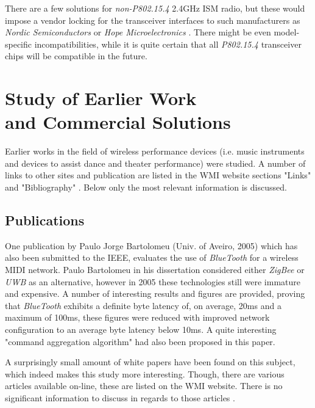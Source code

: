   There are a few solutions for \emph{non-P802.15.4} 2.4GHz ISM radio,
 but these would impose a vendor locking for the transceiver interfaces
 to such manufacturers as \emph{Nordic Semiconductors} \cite{links:nordic:rf2400}
 or \emph{Hope Microelectronics} \cite{links:hoperf:rf2400}.
 There might be even model-specific incompatibilities, while 
 it is quite certain that all \emph{P802.15.4} transceiver
 chips will be compatible in the future.

\break

\section{Study of Earlier Work \\and Commercial Solutions}

  Earlier works in the field of wireless performance devices (i.e. music instruments and
  devices to assist dance and theater performance) were studied. A number of links to
  other sites and publication are listed in the WMI website sections "Links" \cite{wmi:wiki:links}
  and "Bibliography" \cite{wmi:wiki:refs}. Below only the most relevant information is discussed.

\subsection{Publications}

  One publication by Paulo Jorge Bartolomeu (Univ. of Aveiro, 2005)
 \cite{pub:bartolomeu2005} which has also been submitted to the IEEE,
 evaluates the use of \emph{BlueTooth} for a wireless MIDI network.
 Paulo Bartolomeu in his dissertation considered either \emph{ZigBee} or
 \emph{UWB} as an alternative, however in 2005 these technologies
 still were immature and expensive. A number of interesting results and
 figures are provided, proving that \emph{BlueTooth} exhibits a definite
 byte latency of, on average, 20ms and a maximum of 100ms, these figures
 were reduced with improved network configuration to an average byte latency
 below 10ms. A quite interesting "command aggregation algorithm" had also
 been proposed in this paper.

 A surprisingly small amount of white papers have been found on this subject, 
 which indeed makes this study more interesting. Though, there are various
 articles available on-line, these are listed on the WMI website. There is
 no significant information to discuss in regards to those articles
 \cite{links:misc:xbeemidi}.
 
